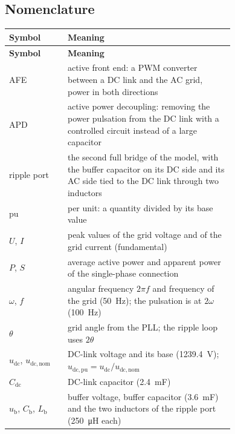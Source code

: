\documentclass[11pt,a4paper]{scrartcl}
\newcommand{\ped}[1]{_{\mathrm{#1}}}
\begin{document}


\tableofcontents
\listoffigures
\listoftables
\newpage

\begin{onehalfspace}

\section*{Nomenclature}
\label{sec:nomenclature}

\begingroup
{}
\begin{longtable}{@{} l p{0.74\linewidth} @{}}
	\toprule
	\textbf{Symbol} & \textbf{Meaning} \\
	\midrule
	\endfirsthead
	\toprule
	\textbf{Symbol} & \textbf{Meaning} \\
	\midrule
	\endhead
	\bottomrule
	\endfoot
	\bottomrule
	\endlastfoot
	AFE & active front end: a PWM converter between a DC link and the AC grid, power in both directions \\
	APD & active power decoupling: removing the power pulsation from the DC link with a controlled circuit instead of a large capacitor \\
	ripple port & the second full bridge of the model, with the buffer capacitor on its DC side and its AC side tied to the DC link through two inductors \\
	pu & per unit: a quantity divided by its base value \\
	$U$, $I$ & peak values of the grid voltage and of the grid current (fundamental) \\
	$P$, $S$ & average active power and apparent power of the single-phase connection \\
	$\omega$, $f$ & angular frequency $2\pi f$ and frequency of the grid (\SI{50}{\hertz}); the pulsation is at $2\omega$ (\SI{100}{\hertz}) \\
	$\theta$ & grid angle from the PLL; the ripple loop uses $2\theta$ \\
	$u\ped{dc}$, $u\ped{dc,nom}$ & DC-link voltage and its base (\SI{1239.4}{\volt}); $u\ped{dc,pu} = u\ped{dc}/u\ped{dc,nom}$ \\
	$C\ped{dc}$ & DC-link capacitor (\SI{2.4}{\milli\farad}) \\
	$u\ped{b}$, $C\ped{b}$, $L\ped{b}$ & buffer voltage, buffer capacitor (\SI{3.6}{\milli\farad}) and the two inductors of the ripple port (\SI{250}{\micro\henry} each) \\

\end{longtable}
\end{onehalfspace}
\end{document}
